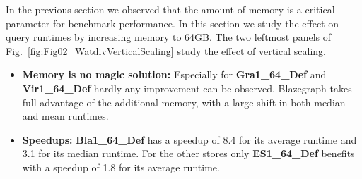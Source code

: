 %

%
%
In the previous section we observed that the amount of memory is a critical parameter for benchmark performance. 
In this section we study the effect on query runtimes by increasing memory to 64GB.
The two leftmost panels of Fig.~\ref{fig:Fig02_WatdivVerticalScaling} study the effect of vertical scaling. 
%

\begin{itemize}
	\item \textbf{Memory is no magic solution:} Especially for \textbf{Gra1\_64\_Def} and \textbf{Vir1\_64\_Def} hardly any improvement can be observed. Blazegraph takes full advantage of the additional memory, with a large shift in both median and mean runtimes. %
	\item \textbf{Speedups:} \textbf{Bla1\_64\_Def} has a speedup of 8.4 for its average runtime and 3.1 for its median runtime. For the other stores only \textbf{ES1\_64\_Def} benefits with a speedup of 1.8 for its average runtime.
\end{itemize}

